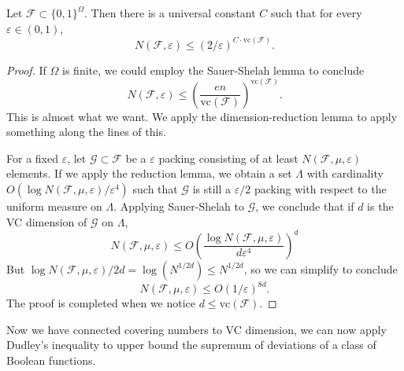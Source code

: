 \begin{theorem}
	Let $\mathcal{F} \subset \{ 0, 1 \}^\Omega$. Then there is a universal constant $C$ such that for every $\varepsilon \in (0,1)$,
	\[ N(\mathcal{F},\varepsilon) \leq (2/\varepsilon)^{C \cdot \text{vc}(\mathcal{F})}. \]
\end{theorem}
\begin{proof}
	If $\Omega$ is finite, we could employ the Sauer-Shelah lemma to conclude
	\[ N(\mathcal{F},\varepsilon) \leq \left( \frac{en}{\text{vc}(\mathcal{F})} \right)^{\text{vc}(\mathcal{F})}. \]
	This is almost what we want. We apply the dimension-reduction lemma to apply something along the lines of this.

	For a fixed $\varepsilon$, let $\mathcal{G} \subset \mathcal{F}$ be a $\varepsilon$ packing consisting of at least $N(\mathcal{F},\mu,\varepsilon)$ elements. If we apply the reduction lemma, we obtain a set $\Lambda$ with cardinality $O(\log N(\mathcal{F},\mu,\varepsilon) / \varepsilon^4)$ such that $\mathcal{G}$ is still a $\varepsilon/2$ packing with respect to the uniform measure on $\Lambda$. Applying Sauer-Shelah to $\mathcal{G}$, we conclude that if $d$ is the VC dimension of $\mathcal{G}$ on $\Lambda$,
	\[ N(\mathcal{F},\mu,\varepsilon) \leq O \left( \frac{\log N(\mathcal{F},\mu,\varepsilon)}{d \varepsilon^4} \right)^d \]
	But $\log N(\mathcal{F},\mu,\varepsilon)/2d = \log(N^{1/2d}) \leq N^{1/2d}$, so we can simplify to conclude
	\[ N(\mathcal{F},\mu,\varepsilon) \leq O(1/\varepsilon)^{8d}. \]
	The proof is completed when we notice $d \leq \text{vc}(\mathcal{F})$.
\end{proof}

Now we have connected covering numbers to VC dimension, we can now apply Dudley's inequality to upper bound the supremum of deviations of a class of Boolean functions.


